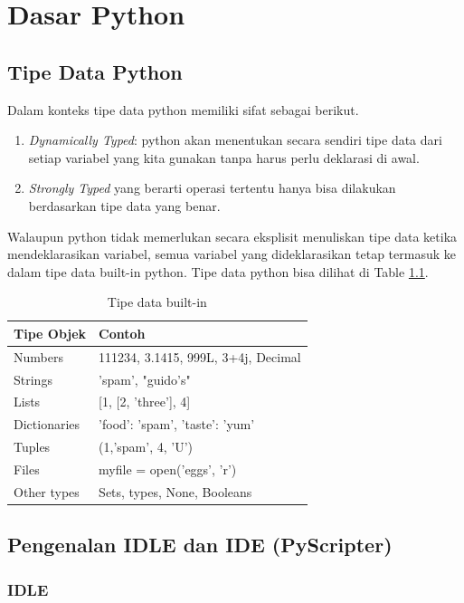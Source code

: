 \chapter{Dasar Python}

\section{Tipe Data Python}

Dalam konteks tipe data python memiliki sifat sebagai berikut.
\begin{enumerate}
	\item \textit{Dynamically Typed}: python akan menentukan secara sendiri tipe data dari setiap variabel yang kita gunakan tanpa harus perlu deklarasi di awal.
	\item \textit{Strongly Typed} yang berarti operasi tertentu hanya bisa dilakukan berdasarkan tipe data yang benar. 
\end{enumerate}

Walaupun python tidak memerlukan secara eksplisit menuliskan tipe data ketika mendeklarasikan variabel, semua variabel yang dideklarasikan tetap termasuk ke dalam tipe data built-in python. Tipe data python bisa dilihat di Table \ref{tbl:tipeDataPython}.

\begin{table}[H]%
\caption{Tipe data built-in}
\centering
\begin{tabular}{|l|l|}
\hline
Tipe Objek & Contoh \\
\hline
Numbers & 111234, 3.1415, 999L, 3+4j, Decimal\\
Strings & 'spam', "guido's"\\
Lists & [1, [2, 'three'], 4]\\
Dictionaries & {'food': 'spam', 'taste': 'yum'}\\
Tuples & (1,'spam', 4, 'U')\\
Files & myfile = open('eggs', 'r')\\
Other types & Sets, types, None, Booleans\\
\hline
\end{tabular}
\label{tbl:tipeDataPython}
\end{table} 

\section{Pengenalan IDLE dan IDE (PyScripter)}

\subsection{IDLE}

